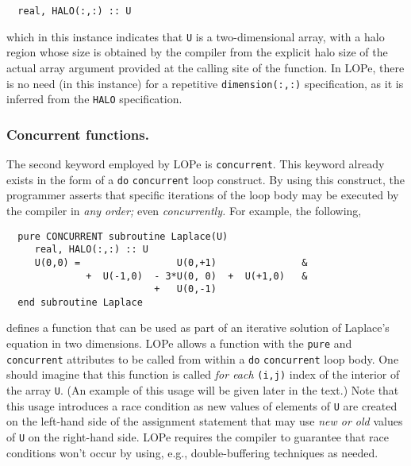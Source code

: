 \begin{verbatim}
  real, HALO(:,:) :: U
\end{verbatim}
which in this instance indicates that \texttt{U} is a two-dimensional
array, with a halo region whose size is obtained by the compiler from
the explicit halo size of the actual array argument provided at the
calling site of the function.  In LOPe, there is no need (in this
instance) for a repetitive \texttt{dimension(:,:)} specification, as
it is inferred from the \texttt{HALO} specification.

\subsubsection{Concurrent functions.}
The second keyword employed by LOPe is \texttt{concurrent}.  This keyword already exists in the form
of a \texttt{do} \texttt{concurrent} loop construct.  By using this construct, the programmer
asserts that specific iterations of the loop body may be executed by the compiler in \emph{any
  order;} even \emph{concurrently.}
For example, the following,
\begin{verbatim}
  pure CONCURRENT subroutine Laplace(U)
     real, HALO(:,:) :: U
     U(0,0) =                 U(0,+1)               &
              +  U(-1,0)  - 3*U(0, 0)  +  U(+1,0)   &
                          +   U(0,-1)
  end subroutine Laplace
\end{verbatim}
defines a function that can be used as part of an iterative solution
of Laplace's equation in two dimensions.  LOPe allows a function with
the \texttt{pure} and \texttt{concurrent} attributes to be called from
within a \texttt{do} \texttt{concurrent} loop body.  One should
imagine that this function is called \emph{for each} \texttt{(i,j)}
index of the interior of the array \texttt{U}.  (An example of this
usage will be given later in the text.)  Note that this usage
introduces a race condition as new values of elements of \texttt{U}
are created on the left-hand side of the assignment statement that may
use \emph{new or old} values of \texttt{U} on the right-hand side.
LOPe requires the compiler to guarantee that race conditions won't
occur by using, e.g., double-buffering techniques as needed.

